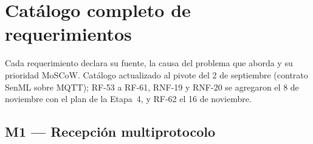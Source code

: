 \chapter[Catálogo de requerimientos]{Catálogo completo de requerimientos}
\label{anx:requerimientos}
\small
\setlength{\tabcolsep}{4pt}

Cada requerimiento declara su fuente, la causa del problema que aborda y su prioridad MoSCoW.
Catálogo actualizado al pivote del 2 de septiembre (contrato SenML sobre MQTT); RF-53 a RF-61, RNF-19 y RNF-20 se agregaron el 8 de noviembre con el plan de la Etapa~4, y RF-62 el 16 de noviembre.

\section{M1 --- Recepción multiprotocolo}
